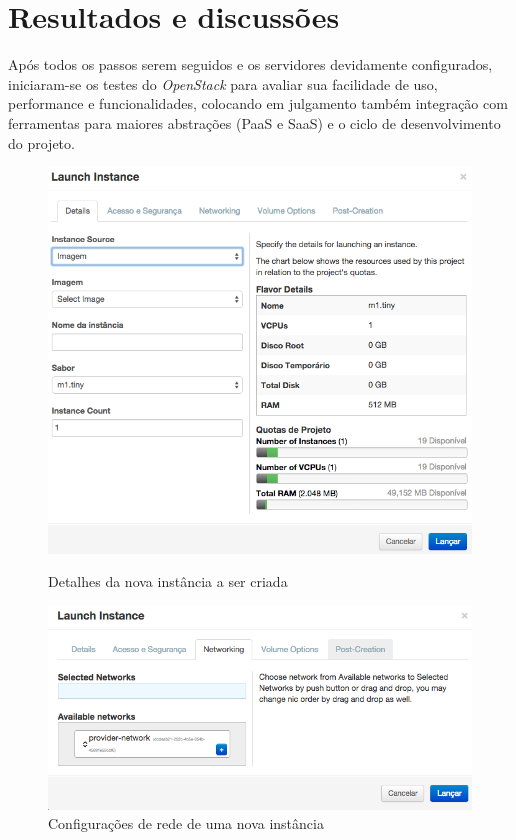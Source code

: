 \chapter{Resultados e discussões}
\label{cha:conclusoes}

Após todos os passos serem seguidos e os servidores devidamente configurados,
iniciaram-se os testes do \emph{OpenStack} para avaliar sua facilidade de uso,
performance e funcionalidades, colocando em julgamento também integração
com ferramentas para maiores abstrações (PaaS e SaaS) e o ciclo de desenvolvimento
do projeto.

\begin{figure}[h]
  \center
  \includegraphics[scale=0.4]{imagem/criar-instancia-detalhes.png}
  \caption{Detalhes da nova instância a ser criada}
  \label{img:criar-instancia-detalhes}
  \center
  \includegraphics[scale=0.4]{imagem/criar-instancia-redes.png}
  \caption{Configurações de rede de uma nova instância}
  \label{img:criar-instancia-redes}
\end{figure}


